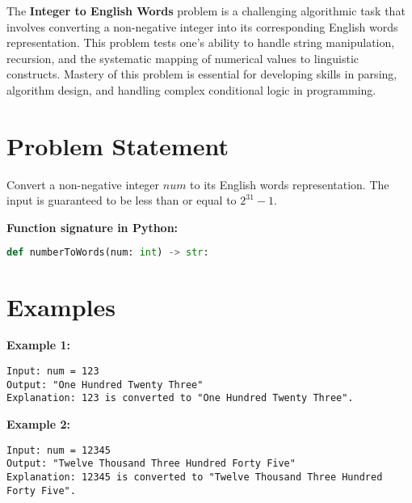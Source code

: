 
\label{chap:Integer_to_English_Words}

The \textbf{Integer to English Words} problem is a challenging algorithmic task that involves converting a non-negative integer into its corresponding English words representation. This problem tests one's ability to handle string manipulation, recursion, and the systematic mapping of numerical values to linguistic constructs. Mastery of this problem is essential for developing skills in parsing, algorithm design, and handling complex conditional logic in programming.

\section*{Problem Statement}

Convert a non-negative integer \(num\) to its English words representation. The input is guaranteed to be less than or equal to \(2^{31} - 1\).

\textbf{Function signature in Python:}
\begin{lstlisting}[language=Python]
def numberToWords(num: int) -> str:
\end{lstlisting}

\section*{Examples}

\textbf{Example 1:}

\begin{verbatim}
Input: num = 123
Output: "One Hundred Twenty Three"
Explanation: 123 is converted to "One Hundred Twenty Three".
\end{verbatim}

\textbf{Example 2:}

\begin{verbatim}
Input: num = 12345
Output: "Twelve Thousand Three Hundred Forty Five"
Explanation: 12345 is converted to "Twelve Thousand Three Hundred Forty Five".
\end{verbatim}

